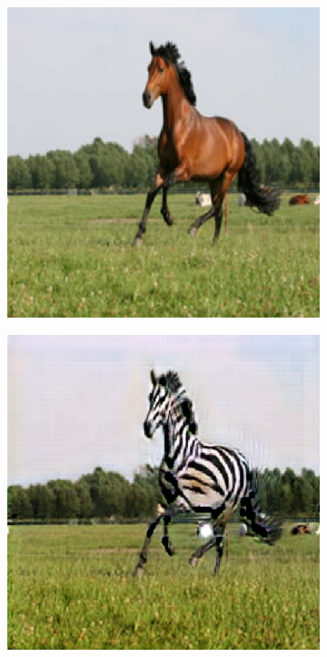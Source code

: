 \begin{figure}
\begin{subfigure}[t]{.2\textwidth}
  \end{subfigure}
  \hfill
  \begin{subfigure}[t]{.2\textwidth}
    \centering
    \includegraphics[width=\linewidth]{images/cycleGanResults/horse_input2.png}
  \end{subfigure}
  \begin{subfigure}[t]{.2\textwidth}
    \centering
    \includegraphics[width=\linewidth]{images/cycleGanResults/horse_output2.png}
  \end{subfigure}


\end{figure}

